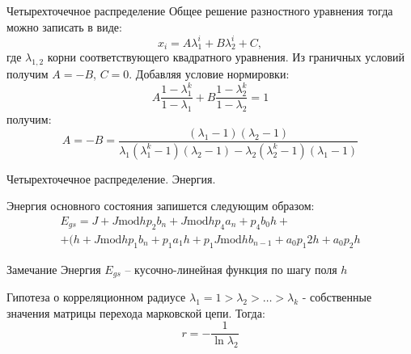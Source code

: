 \documentclass{beamer}
\begin{document}
\begin{frame}{Четырехточечное распределение}
Общее решение разностного уравнения тогда можно записать в виде:
\begin{equation*}
x_i = A \lambda_1^i + B \lambda_2^i + C,
\end{equation*}
где $\lambda_{1,2}$ корни соответствующего квадратного уравнения.
Из граничных условий получим $A=-B$, $C=0$. Добавляя условие нормировки:
\begin{equation*}
A \frac{1-\lambda_1^k}{1-\lambda_1} + B \frac{1-\lambda_2^k}{1-\lambda_2} =1
\end{equation*}
получим:
\begin{equation*}
A=-B = \frac{(\lambda_1-1)(\lambda_2-1)}{\lambda_1(\lambda_1^k-1)(\lambda_2-1) - \lambda_2(\lambda_2^k-1)(\lambda_1-1)}
\end{equation*}
\end{frame}

\begin{frame}{Четырехточечное распределение. Энергия.}
\begin{block}{Энергия основного состояния запишется следующим образом:}
\begin{multline}
E_{gs} = J + J \text{mod} h p_2 b_n + J \text{mod} h p_4 a_n + p_4 b_0 h+\\
+ (h + J \text{mod} h p_1 b_n + p_1 a_1 h +p_1J \text{mod} h b_{n-1} + a_0 p_1 2 h + a_0 p_2 h 
\end{multline}
\end{block}
\begin{block}{Замечание}
Энергия $E_{gs}$ -- кусочно-линейная функция по шагу поля $h$
\end{block}
\end{frame}
\begin{frame}{Гипотеза о корреляционном радиусе}
	$\lambda_1 = 1 > \lambda_2 > \dots >\lambda_k$ - собственные значения матрицы перехода марковской цепи. Тогда:
	\begin{equation*}
	r = -\frac{1}{\ln \lambda_2}
	\end{equation*}
\end{frame}
\end{document}
